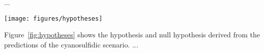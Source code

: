 \documentclass[modern,linenumbers]{aastex631}
\begin{document}
%


%

...
\begin{figure*}
    \begin{centering}
        \texttt{[image: figures/hypotheses]}
        \caption{Population-level hypothesis and null hypothesis on UV irradiance derived from the cyanosulfidic scenario.}
        \label{fig:hypotheses}
    \end{centering}
\end{figure*}
Figure~\ref{fig:hypotheses} shows the hypothesis and null hypothesis derived from the predictions of the cyanosulfidic scenario.
...
\end{document}

